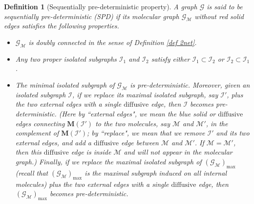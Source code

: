 \documentclass{article}
\newcommand{\1}{\mathds{1}}
\numberwithin{equation}{section}
\newcommand{\be}{\begin{equation}}
\newcommand{\ee}{\end{equation}}
\renewcommand{\cal}{\mathcal}
\newcommand{\dashed}{\text{diffusive}}
\theoremstyle{plain} %
\newtheorem{definition}[theorem]{Definition}
\theoremstyle{remark}
\newcommand{\cor}{\color{red}}
\newcommand{\Pol}{{\mathbf{M}}}
\newcommand{\Iso}{{\mathcal I}}
\newcommand{\hty}[1]{{\cor (ht: #1) }}
\begin{document}
\begin{definition}[Sequentially pre-deterministic property]\label{def seqPDG}
A graph $\cal G$ is said to be sequentially pre-deterministic (SPD) if its molecular graph $\cal G_{\cal M}$ without red solid edges satisfies the following properties.
\begin{itemize}
\item[(i)] $\cal G_{\cal M}$ is doubly connected in the sense of Definition \ref{def 2net}.

\item[(ii)] Any two proper isolated subgraphs $\Iso_1$ and $\Iso_2$ satisfy either $\Iso_1\subset \Iso_2$ or $\Iso_2\subset \Iso_1$.


\item[(iii)] %
The minimal isolated subgraph of $\cal G_{\cal M}$ is pre-deterministic. Moreover, given an isolated subgraph $\Iso$, if we replace its maximal isolated subgraph, say $\Iso'$, plus the two external edges with a single $\dashed$ edge, then $\Iso$ becomes pre-deterministic. (Here by ``external edges", we mean the blue solid or $\dashed$ edges connecting $\Pol(\Iso')$ to the two molecules, say $\cal M$ and $\cal M'$, in the complement of $\Pol(\Iso')$; by ``replace", we mean that we remove  $\Iso'$ and its two external edges, and add a $\dashed$ edge between $\cal M$ and $\cal M'$. If $\cal M=\cal M'$, then this $\dashed$ edge is inside $\cal M$ and will not appear in the molecular graph.) Finally, if we replace the maximal isolated subgraph of $(\cal G_{\cal M})_{\max}$ (recall that $(\cal G_{\cal M})_{\max}$ is the maximal subgraph induced on all internal molecules) plus the two external edges with a single $\dashed$ edge, then $(\cal G_{\cal M})_{\max}$ becomes pre-deterministic. 
\end{itemize}

\end{definition}
\end{document}
